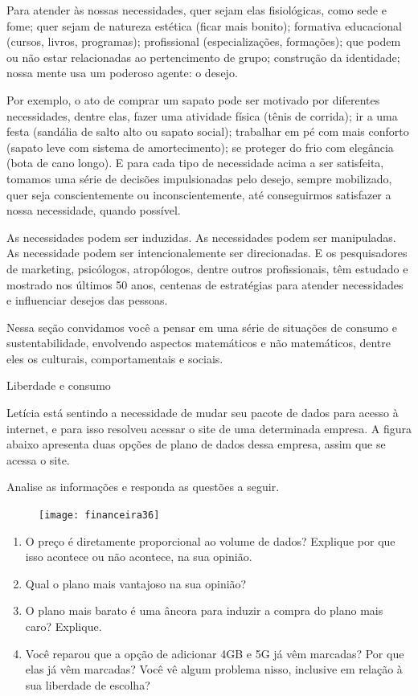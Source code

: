 \label{fin-exp-9}

Para atender às nossas necessidades, quer sejam elas fisiológicas, como sede e fome; quer sejam de natureza estética (ficar mais bonito); formativa educacional (cursos, livros, programas); profissional (especializações, formações); que podem ou não estar relacionadas ao pertencimento de grupo; construção da identidade; nossa mente usa um poderoso agente: o desejo.

Por exemplo, o ato de comprar um sapato pode ser motivado por diferentes necessidades, dentre elas, fazer uma atividade física (tênis de corrida); ir a uma festa (sandália de salto alto ou sapato social); trabalhar em pé com mais conforto (sapato leve com sistema de amortecimento); se proteger do frio com elegância (bota de cano longo). E para cada tipo de necessidade acima a ser satisfeita, tomamos uma série de decisões impulsionadas pelo desejo, sempre mobilizado, quer seja conscientemente ou inconscientemente, até conseguirmos satisfazer a nossa necessidade, quando possível.

As necessidades podem ser induzidas. As necessidades podem ser manipuladas. As necessidade podem ser intencionalemente ser direcionadas. E os pesquisadores de marketing, psicólogos, atropólogos, dentre outros profissionais, têm estudado e mostrado nos últimos 50 anos, centenas de estratégias para atender necessidades e influenciar desejos das pessoas.

Nessa seção convidamos você a pensar em uma série de situações de consumo e sustentabilidade, envolvendo aspectos matemáticos e não matemáticos, dentre eles os culturais, comportamentais e sociais.

\begin{task}{Liberdade e consumo}
\label{fin-ativ-37}


Letícia está sentindo a necessidade de mudar seu pacote de dados para acesso à internet, e para isso resolveu acessar o site de uma determinada empresa. A figura abaixo apresenta duas opções de plano de dados dessa empresa, assim que se acessa o site.

Analise as informações e responda as questões a seguir.

\begin{figure}[H]
\centering

\texttt{[image: financeira36]}
\end{figure}

\begin{enumerate}
  \item O preço é diretamente proporcional ao volume de dados? Explique por que isso acontece ou não acontece, na sua opinião.
  \item Qual o plano mais vantajoso na sua opinião?
  \item O plano mais barato é uma âncora para induzir a compra do plano mais caro? Explique.
  \item Você reparou que a opção de adicionar 4GB e 5G já vêm marcadas? Por que elas já vêm marcadas? Você vê algum problema nisso, inclusive em relação à sua liberdade de escolha?
\end{enumerate}
\end{task}

